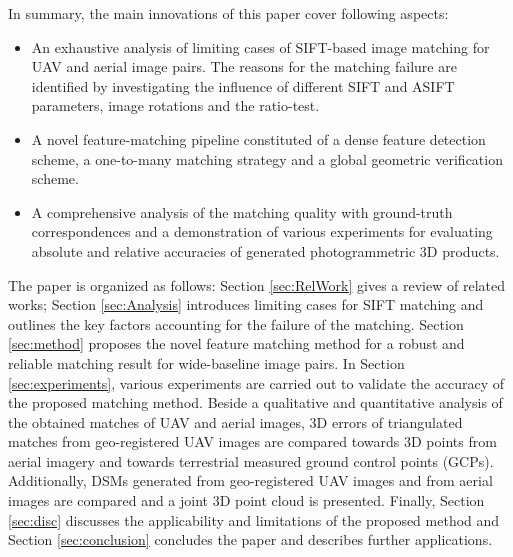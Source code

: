 In summary, the main innovations of this paper cover following aspects:
\begin{itemize}[leftmargin=*,labelsep=4mm]
\item An exhaustive analysis of limiting cases of SIFT-based image matching for UAV and aerial image pairs. The reasons for the matching failure are identified by investigating the influence of different SIFT and ASIFT parameters, image rotations and the ratio-test.
\item A novel feature-matching pipeline constituted of a dense feature detection scheme, a one-to-many matching strategy and a global geometric verification scheme.
\item A comprehensive analysis of the matching quality with ground-truth correspondences and a demonstration of various experiments for evaluating absolute and relative accuracies of generated  photogrammetric 3D products.
\end{itemize}

The paper is organized as follows: Section \ref{sec:RelWork} gives a review of related works; Section \ref{sec:Analysis} introduces limiting cases for SIFT matching and outlines the key factors accounting for the failure of the matching. 
Section \ref{sec:method} proposes the novel feature matching method for a robust and reliable matching result for wide-baseline image pairs.
In Section \ref{sec:experiments}, various experiments are carried out to validate the accuracy of the proposed matching method. 
Beside a qualitative and quantitative analysis of the obtained matches of UAV and aerial images, 3D errors of triangulated matches from geo-registered UAV images are compared towards 3D points from aerial imagery and towards terrestrial measured ground control points (GCPs). 
Additionally, DSMs generated from geo-registered UAV images and from aerial images are compared and a joint 3D point cloud is presented.
Finally, Section \ref{sec:disc} discusses the applicability and limitations of the proposed method and Section \ref{sec:conclusion} concludes the paper and describes further applications.

